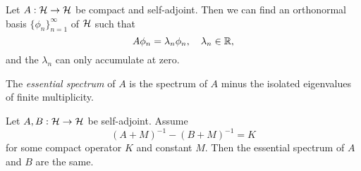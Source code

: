 \begin{theorem}
  Let $A : \mathcal{H} \to \mathcal{H}$ be compact and self-adjoint.
  Then we can find an orthonormal basis
  $\{\phi_n\}_{n = 1}^\infty$ of $\mathcal{H}$ such that
  \[
    A \phi_n = \lambda_n \phi_n,
    \quad \lambda_n \in \mathbb{R},
  \]
  and the $\lambda_n$ can only accumulate at zero.
\end{theorem}

\begin{definition}
  The \emph{essential spectrum} of $A$ is the spectrum
  of $A$ minus the isolated eigenvalues of finite
  multiplicity.
\end{definition}

\begin{theorem}
  Let $A, B : \mathcal{H} \to \mathcal{H}$ be self-adjoint. Assume
  \[
    (A + M)^{-1} - (B + M)^{-1} = K
  \]
  for some compact operator $K$ and
  constant $M$. Then the essential spectrum of
  $A$ and $B$ are the same.
\end{theorem}

